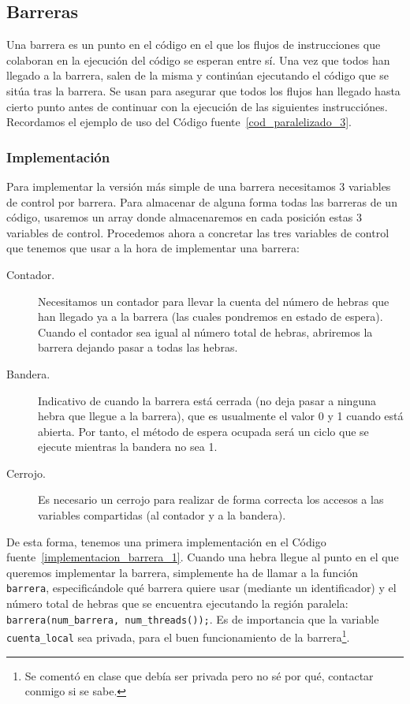 \subsection{Barreras}
Una barrera es un punto en el código en el que los flujos de instrucciones que colaboran en la ejecución del código se esperan entre sí. Una vez que todos han llegado a la barrera, salen de la misma y continúan ejecutando el código que se sitúa tras la barrera. Se usan para asegurar que todos los flujos han llegado hasta cierto punto antes de continuar con la ejecución de las siguientes instrucciónes. Recordamos el ejemplo de uso del Código fuente~\ref{cod_paralelizado_3}.

\subsubsection{Implementación}
Para implementar la versión más simple de una barrera necesitamos 3 variables de control por barrera. Para almacenar de alguna forma todas las barreras de un código, usaremos un array donde almacenaremos en cada posición estas 3 variables de control. Procedemos ahora a concretar las tres variables de control que tenemos que usar a la hora de implementar una barrera:
\begin{description}
    \item [Contador.] Necesitamos un contador para llevar la cuenta del número de hebras que han llegado ya a la barrera (las cuales pondremos en estado de espera). Cuando el contador sea igual al número total de hebras, abriremos la barrera dejando pasar a todas las hebras.
    \item [Bandera.] Indicativo de cuando la barrera está cerrada (no deja pasar a ninguna hebra que llegue a la barrera), que es usualmente el valor 0 y 1 cuando está abierta. Por tanto, el método de espera ocupada será un ciclo que se ejecute mientras la bandera no sea 1.
    \item [Cerrojo.] Es necesario un cerrojo para realizar de forma correcta los accesos a las variables compartidas (al contador y a la bandera).
\end{description}
De esta forma, tenemos una primera implementación en el Código fuente~\ref{implementacion_barrera_1}. Cuando una hebra llegue al punto en el que queremos implementar la barrera, simplemente ha de llamar a la función \verb|barrera|, especificándole qué barrera quiere usar (mediante un identificador) y el número total de hebras que se encuentra ejecutando la región paralela: \verb|barrera(num_barrera, num_threads());|. Es de importancia que la variable \verb|cuenta_local| sea privada, para el buen funcionamiento de la barrera\footnote{Se comentó en clase que debía ser privada pero no sé por qué, contactar conmigo si se sabe.}.

